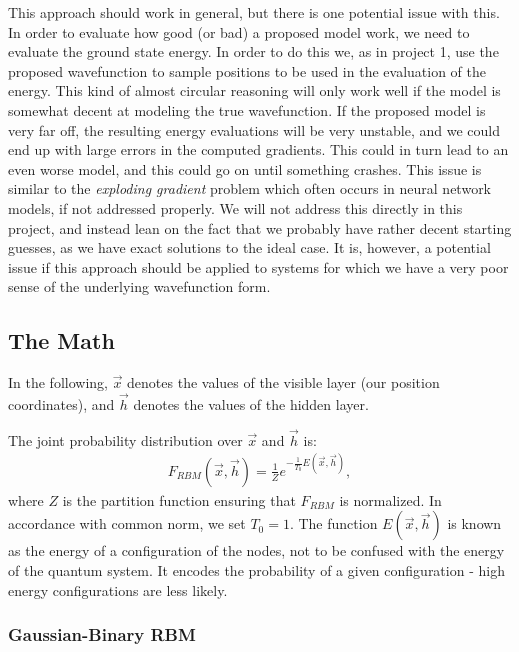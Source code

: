 \documentclass[a4paper, 11pt]{article}
\begin{document}
\begin{multicols}{2}
    This approach should work in general, but there is one potential issue with
    this. In order to evaluate how good (or bad) a proposed model work, we need
    to evaluate the ground state energy. In order to do this we, as in project
    1, use the proposed wavefunction to sample positions to be used in the
    evaluation of the energy. This kind of almost circular reasoning will only work
    well if the model is somewhat decent at modeling the true wavefunction. If
    the proposed model is very far off, the resulting energy evaluations will be
    very unstable, and we could end up with large errors in the computed
    gradients. This could in turn lead to an even worse model, and this could go
    on until something crashes. This issue is similar to the \emph{exploding
    gradient} problem which often occurs in neural network models, if not
    addressed properly. We will not address this directly in this project, and
    instead lean on the fact that we probably have rather decent starting
    guesses, as we have exact solutions to the ideal case. It is, however, a
    potential issue if this approach should be applied to systems for which we
    have a very poor sense of the underlying wavefunction form.

    \subsection{The Math}

    In the following, $\vec x$ denotes the values of the visible layer (our
    position coordinates), and $\vec h$ denotes the values of the hidden layer.

    The joint probability distribution over $\vec x$ and $\vec h$ is:
    \begin{align}
        F_{RBM}(\vec x, \vec h) = \frac{1}{Z} e^{-\frac{1}{T_0}E(\vec x, \vec
        h)}\label{eq:F-RBM-def},
    \end{align}
    where $Z$ is the partition function ensuring that $F_{RBM}$ is normalized.
    In accordance with common norm, we set $T_0=1$. The function $E(\vec x, \vec
    h)$ is known as the energy of a configuration of the nodes, not to be
    confused with the energy of the quantum system. It encodes the probability
    of a given configuration - high energy configurations are less likely.

    \subsubsection{Gaussian-Binary RBM}


\end{multicols}
\end{document}

